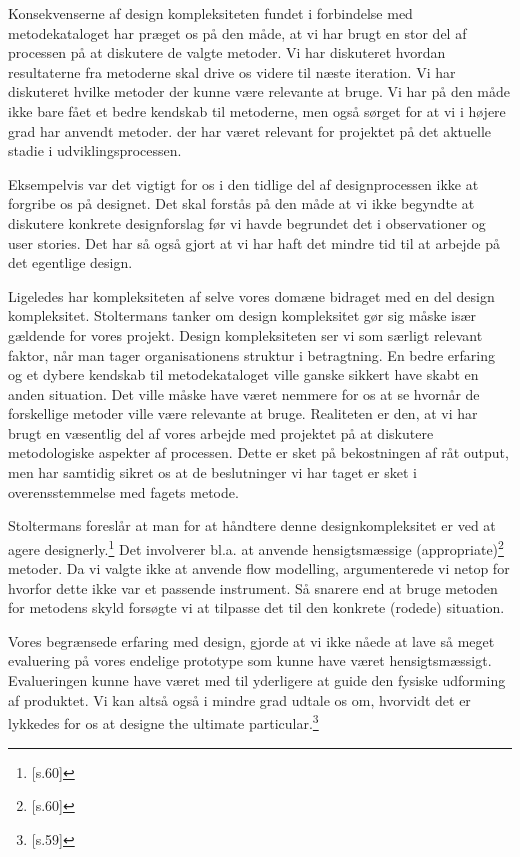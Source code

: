 Konsekvenserne af design kompleksiteten fundet i forbindelse med metodekataloget har præget os på den måde, at vi har brugt en stor del af processen på at diskutere de valgte metoder. Vi har diskuteret hvordan resultaterne fra metoderne skal drive os videre til næste iteration. Vi har diskuteret hvilke metoder der kunne være relevante at bruge. Vi har på den måde ikke bare fået et bedre kendskab til metoderne, men også sørget for at vi i højere grad har anvendt metoder. der har været relevant for projektet på det aktuelle stadie i udviklingsprocessen. 

Eksempelvis var det vigtigt for os i den tidlige del af designprocessen ikke at forgribe os på designet. Det skal forstås på den måde at vi ikke begyndte at diskutere konkrete designforslag før vi havde begrundet det i observationer og user stories. Det har så også gjort at vi har haft det mindre tid til at arbejde på det egentlige design.

Ligeledes har kompleksiteten af selve vores domæne bidraget med en del design kompleksitet. Stoltermans tanker om design kompleksitet gør sig måske især gældende for vores projekt. Design kompleksiteten ser vi som særligt relevant faktor, når man tager organisationens struktur i betragtning. En bedre erfaring og et dybere kendskab til metodekataloget ville ganske sikkert have skabt en anden situation. Det ville måske have været nemmere for os at se hvornår de forskellige metoder ville være relevante at bruge. Realiteten er den, at vi har brugt en væsentlig del af vores arbejde med projektet på at diskutere metodologiske aspekter af processen. Dette er sket på bekostningen af råt output, men har samtidig sikret os at de beslutninger vi har taget er sket i overensstemmelse med fagets metode.

Stoltermans foreslår at man for at håndtere denne designkompleksitet er ved at agere designerly.\footnote{\citep{Stolterman}[s.60]} Det involverer bl.a. at anvende hensigtsmæssige (appropriate)\footnote{\citep{Stolterman}[s.60]} metoder. Da vi valgte ikke at anvende flow modelling, argumenterede vi netop for hvorfor dette ikke var et passende instrument. Så snarere end at bruge metoden for metodens skyld forsøgte vi at tilpasse det til den konkrete (rodede) situation. 

Vores begrænsede erfaring med design, gjorde at vi ikke nåede at lave så meget evaluering på vores endelige prototype som kunne have været hensigtsmæssigt. Evalueringen kunne have været med til yderligere at guide den fysiske udforming af produktet. Vi kan altså også i mindre grad udtale os om, hvorvidt det er lykkedes for os at designe the ultimate particular.\footnote{\citep{Stolterman}[s.59]}

